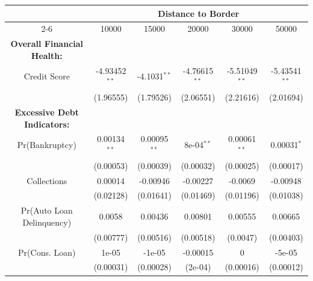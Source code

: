 \begin{tabular}{@{\extracolsep{5pt}}cccccc} 
\toprule
\midrule
& \multicolumn{5}{c}{Distance to Border} \\
\cmidrule(lr){2-6}
  & 10000 & 15000 & 20000 & 30000 & 50000 \\ 
\midrule

\textbf{Overall Financial Health:}  &  & & & & \\ 
 Credit Score & -4.93452$^{**}$ & -4.1031$^{**}$ & -4.76615$^{**}$ & -5.51049$^{**}$ & -5.43541$^{**}$ \\ 
  & (1.96555) & (1.79526) & (2.06551) & (2.21616) & (2.01694) \\ 


 \addlinespace
\textbf{Excessive Debt Indicators:}  &  & & & &  \\ 
   Pr(Bankruptcy) & 0.00134$^{**}$ & 0.00095$^{**}$ & 8e-04$^{**}$ & 0.00061$^{**}$ & 0.00031$^{*}$ \\ 
  & (0.00053) & (0.00039) & (0.00032) & (0.00025) & (0.00017) \\ 
     \addlinespace
 Collections & 0.00014 & -0.00946 & -0.00227 & -0.0069 & -0.00948 \\ 
  & (0.02128) & (0.01641) & (0.01469) & (0.01196) & (0.01038) \\ 
   \addlinespace
 Pr(Auto Loan Delinquency) & 0.0058 & 0.00436 & 0.00801 & 0.00555 & 0.00665 \\ 
  & (0.00777) & (0.00516) & (0.00518) & (0.0047) & (0.00403) \\ 
   \addlinespace
 Pr(Cons. Loan) & 1e-05 & -1e-05 & -0.00015 & 0 & -5e-05 \\ 
 & (0.00031) & (0.00028) & (2e-04) & (0.00016) & (0.00012) \\ 
 
\bottomrule 
\end{tabular}